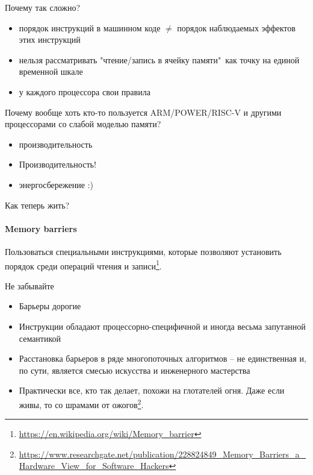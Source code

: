 \begin{frame}{Почему так сложно?}

\begin{itemize}
 \item порядок инструкций в машинном коде $\neq$ порядок наблюдаемых эффектов этих инструкций
 \item нельзя рассматривать "чтение/запись в ячейку памяти"\ как точку на единой временной шкале
 \item у каждого процессора свои правила
\end{itemize}

\pause
Почему вообще хоть кто-то пользуется ARM/POWER/RISC-V и другими процессорами со слабой моделью памяти?

\pause
\begin{itemize}
  \item производительность
  \pause
  \item Производительность!
  \pause
  \item энергосбережение :)
\end{itemize}

\end{frame}


\begin{frame}{Как теперь жить?}
\framesubtitle{Memory barriers}

\pause
 Пользоваться специальными инструкциями, которые позволяют установить порядок среди операций чтения и записи\footnote<2->{\tiny\url{https://en.wikipedia.org/wiki/Memory_barrier}}.

\pause

Не забывайте
\begin{itemize}
  \item Барьеры дорогие
  \item Инструкции обладают процессорно-специфичной и иногда весьма запутанной семантикой
  \item Расстановка барьеров в ряде многопоточных алгоритмов -- не единственная и, по сути, является смесью искусства и инженерного мастерства
  \item Практически все, кто так делает, похожи на глотателей огня. Даже если живы, то со шрамами от ожогов\footnote<3->{\tiny\url{https://www.researchgate.net/publication/228824849_Memory_Barriers_a_Hardware_View_for_Software_Hackers}}.
\end{itemize}

\end{frame}


